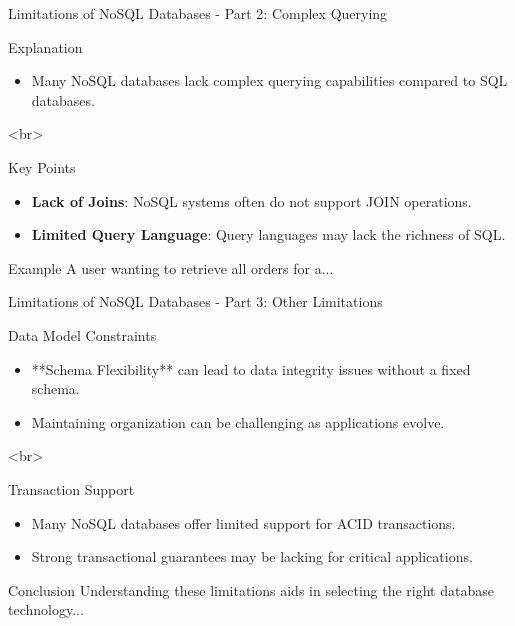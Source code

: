 \documentclass[aspectratio=169]{beamer}
\begin{document}
\begin{frame}[fragile]{Limitations of NoSQL Databases - Part 2: Complex Querying}
    \begin{block}{Explanation}
        \begin{itemize}
            \item Many NoSQL databases lack complex querying capabilities compared to SQL databases.
        \end{itemize}
    \end{block}

    <br>

    \begin{block}{Key Points}
        \begin{itemize}
            \item \textbf{Lack of Joins}: NoSQL systems often do not support JOIN operations.
            \item \textbf{Limited Query Language}: Query languages may lack the richness of SQL.
        \end{itemize}
    \end{block}

    \begin{block}{Example}
        A user wanting to retrieve all orders for a...
    \end{block}
\end{frame}

\begin{frame}[fragile]{Limitations of NoSQL Databases - Part 3: Other Limitations}
    \begin{block}{Data Model Constraints}
        \begin{itemize}
            \item **Schema Flexibility** can lead to data integrity issues without a fixed schema.
            \item Maintaining organization can be challenging as applications evolve.
        \end{itemize}
    \end{block}

    <br>

    \begin{block}{Transaction Support}
        \begin{itemize}
            \item Many NoSQL databases offer limited support for ACID transactions.
            \item Strong transactional guarantees may be lacking for critical applications.
        \end{itemize}
    \end{block}

    \begin{block}{Conclusion}
        Understanding these limitations aids in selecting the right database technology...
    \end{block}
\end{frame}
\end{document}
